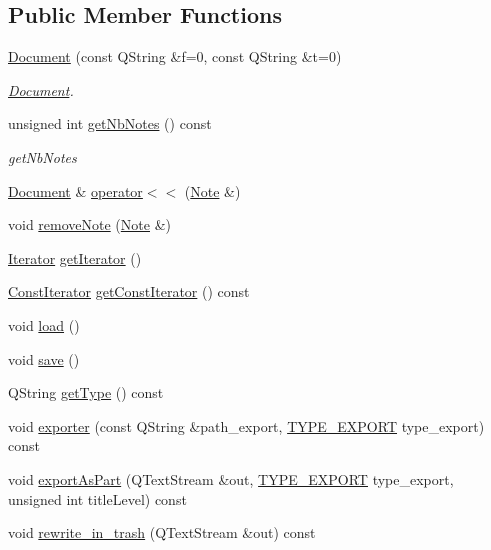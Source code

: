 \subsection*{Public Member Functions}
\begin{DoxyCompactItemize}
\item 
\hyperlink{class_notes_module_1_1_document_acaa187ab49207967fde7907bc0e60dcd}{Document} (const Q\-String \&f=0, const Q\-String \&t=0)
\begin{DoxyCompactList}\small\item\em \hyperlink{class_notes_module_1_1_document}{Document}. \end{DoxyCompactList}\item 
unsigned int \hyperlink{class_notes_module_1_1_document_aa3d4e2d5c1a2de0deed5397ac968f60c}{get\-Nb\-Notes} () const 
\begin{DoxyCompactList}\small\item\em get\-Nb\-Notes \end{DoxyCompactList}\item 
\hyperlink{class_notes_module_1_1_document}{Document} \& \hyperlink{class_notes_module_1_1_document_a996e1073763a5aecfc084b1b9d5a3c59}{operator$<$$<$} (\hyperlink{class_notes_module_1_1_note}{Note} \&)
\item 
void \hyperlink{class_notes_module_1_1_document_ae4cd1acd1409d6104b431d0651de4f63}{remove\-Note} (\hyperlink{class_notes_module_1_1_note}{Note} \&)
\item 
\hyperlink{class_notes_module_1_1_document_1_1_iterator}{Iterator} \hyperlink{class_notes_module_1_1_document_a2c7f6c0800e1f38024e25488b1e2279a}{get\-Iterator} ()
\item 
\hyperlink{class_notes_module_1_1_document_1_1_const_iterator}{Const\-Iterator} \hyperlink{class_notes_module_1_1_document_a77bcd875ad588922cdfcceff5424b270}{get\-Const\-Iterator} () const 
\item 
void \hyperlink{class_notes_module_1_1_document_ad0fea07bbaefaa72aec840f6a2810575}{load} ()
\item 
void \hyperlink{class_notes_module_1_1_document_a0d0b52257a143ee3d326c85ec18e120a}{save} ()
\item 
Q\-String \hyperlink{class_notes_module_1_1_document_a81a379f903469fc3e8aa3435647010e2}{get\-Type} () const 
\item 
void \hyperlink{class_notes_module_1_1_document_a1c25f6e58024fa1827044e830b523b7b}{exporter} (const Q\-String \&path\-\_\-export, \hyperlink{_t_y_p_e_s___e_x_p_o_r_t_8h_a25a17d8584d83ab977791df2476e006c}{T\-Y\-P\-E\-\_\-\-E\-X\-P\-O\-R\-T} type\-\_\-export) const 
\item 
void \hyperlink{class_notes_module_1_1_document_ae73c3ee1513e494bd16bf4b403b50654}{export\-As\-Part} (Q\-Text\-Stream \&out, \hyperlink{_t_y_p_e_s___e_x_p_o_r_t_8h_a25a17d8584d83ab977791df2476e006c}{T\-Y\-P\-E\-\_\-\-E\-X\-P\-O\-R\-T} type\-\_\-export, unsigned int title\-Level) const 
\item 
void \hyperlink{class_notes_module_1_1_document_af99261b1cf3e0e36e0bf61b931dae7c7}{rewrite\-\_\-in\-\_\-trash} (Q\-Text\-Stream \&out) const 
\end{DoxyCompactItemize}
